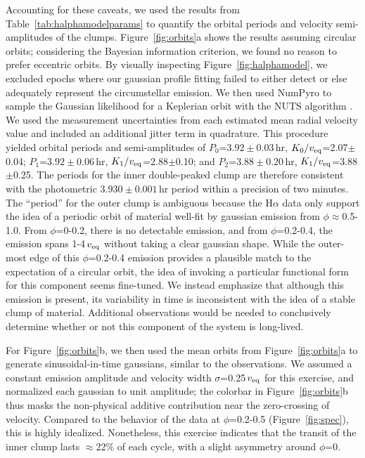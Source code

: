 \documentclass[11pt,twocolumn,tighten,linenumbers]{aastex7}
\begin{document}
Accounting for these caveats, we used the results from
Table~\ref{tab:halphamodelparams} to quantify the orbital periods and
velocity semi-amplitudes of the clumps.  Figure~\ref{fig:orbits}a
shows the results assuming circular orbits; considering the Bayesian
information criterion, we found no reason to prefer eccentric orbits.
By visually inspecting Figure~\ref{fig:halphamodel}, we
excluded epochs where our gaussian profile fitting failed to either
detect or else adequately represent the circumstellar emission.  We
then used NumPyro to sample the Gaussian likelihood for a Keplerian
orbit with the NUTS algorithm \citep{Phan2019}.  We used the
measurement uncertainties from each estimated mean radial velocity
value and included an additional jitter term in quadrature.  This
procedure yielded orbital periods and semi-amplitudes of
$P_0$=$3.92\pm0.03$\,hr, $K_0/v_{\rm eq}$=2.07$\pm$0.04;
$P_1$=$3.92\pm0.06$\,hr, $K_1/v_{\rm eq}$=2.88$\pm$0.10;
and $P_2$=$3.88\pm0.20$\,hr, $K_1/v_{\rm eq}$=3.88$\pm$0.25.
The periods for the inner double-peaked clump are therefore consistent
with the photometric $3.930\pm0.001$\,hr period within a precision of
two minutes.  The ``period'' for the outer clump is ambiguous because
the H$\alpha$ data only support the idea of a periodic orbit of
material well-fit by gaussian emission from $\phi$$\approx$0.5-1.0.
From $\phi$=0-0.2, there is no detectable emission, and from
$\phi$=0.2-0.4, the emission spans 1-4\,$v_{\rm eq}$ without taking a
clear gaussian shape.  While the outer-most edge of this
$\phi$=0.2-0.4 emission provides a plausible match to the expectation
of a circular orbit, the idea of invoking a particular functional form
for this component seems fine-tuned.  We instead emphasize that
although this emission is present, its variability in time is
inconsistent with the idea of a stable clump of material.  Additional
observations would be needed to conclusively determine whether or not
this component of the system is long-lived.

For Figure~\ref{fig:orbits}b, we then used the mean orbits from
Figure~\ref{fig:orbits}a to generate sinusoidal-in-time gaussians,
similar to the observations.  We assumed a constant emission amplitude
and velocity width $\sigma$=0.25\,$v_{\rm eq}$ for this exercise, and
normalized each gaussian to unit amplitude;  the colorbar in
Figure~\ref{fig:orbits}b thus masks the non-physical additive
contribution near the zero-crossing of velocity.  Compared to the
behavior of the data at $\phi$=0.2-0.5 (Figure~\ref{fig:spec}), this
is highly idealized.  Nonetheless, this exercise indicates that the
transit of the inner clump lasts $\approx$22\% of each cycle, with a
slight asymmetry around $\phi$=0.
\end{document}
